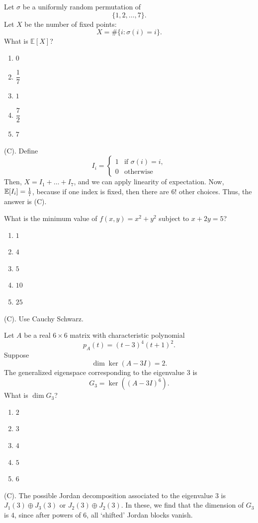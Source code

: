 \begin{exercise}
Let $\sigma$ be a uniformly random
permutation of
\[
\{1,2,\ldots,7\}.
\]
Let $X$ be the number of fixed points:
\[
X=\#\{i:\sigma(i)=i\}.
\]
What is $\mathbb E[X]$?
\begin{enumerate}[label=(\Alph*)]
    \item $0$
    \item $\dfrac17$
    \item $1$
    \item $\dfrac72$
    \item $7$
\end{enumerate}
\end{exercise}
\begin{solution}
(C). Define 
\[
I_i = \begin{cases}
1 & \text{if } \sigma (i) = i, \\
0 & \text{otherwise}
\end{cases}
\]
Then, $X = I_1 + \dots + I_7$, and we can apply linearity of expectation.
Now, $\mathbb{E}[I_i] = \frac{1}{7}$, because if one index is fixed, then there are $6!$ other choices.
Thus, the answer is (C).
\end{solution}


\begin{exercise}
What is the minimum value of $f(x,y)=x^2+y^2$ subject to $x + 2y = 5$?
\begin{enumerate}[label=(\Alph*)]
    \item $1$
    \item $4$
    \item $5$
    \item $10$
    \item $25$
\end{enumerate}
\end{exercise}
\begin{solution}
(C). Use Cauchy Schwarz.
\end{solution}


\begin{exercise}
Let $A$ be a real $6\times6$ matrix
with characteristic polynomial
\[
p_A(t)=(t-3)^4(t+1)^2.
\]
Suppose
\[
\dim\ker(A-3I)=2.
\]
The generalized eigenspace
corresponding to the eigenvalue $3$ is
\[
G_3=\ker((A-3I)^6).
\]
What is $\dim G_3$?
\begin{enumerate}[label=(\Alph*)]
    \item $2$
    \item $3$
    \item $4$
    \item $5$
    \item $6$
\end{enumerate}
\end{exercise}
\begin{solution}
(C). The possible Jordan decomposition associated to the eigenvalue $3$ is $J_1(3) \oplus J_3(3)$
or $J_2(3) \oplus J_2(3)$. In these, we find that the dimension of $G_3$ is $4$, since after 
powers of $6$, all `shifted' Jordan blocks vanish.
\end{solution}

